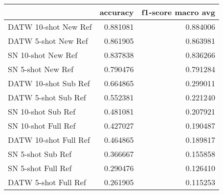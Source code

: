 \begin{tabular}{lrr}
\toprule
 & accuracy & f1-score macro avg \\
\midrule
DATW 10-shot New Ref & {\cellcolor[HTML]{08306B}} \color[HTML]{F1F1F1} 0.881081 & {\cellcolor[HTML]{08306B}} \color[HTML]{F1F1F1} 0.884006 \\
DATW 5-shot New Ref & {\cellcolor[HTML]{083776}} \color[HTML]{F1F1F1} 0.861905 & {\cellcolor[HTML]{083674}} \color[HTML]{F1F1F1} 0.863981 \\
SN 10-shot New Ref & {\cellcolor[HTML]{084285}} \color[HTML]{F1F1F1} 0.837838 & {\cellcolor[HTML]{084082}} \color[HTML]{F1F1F1} 0.836266 \\
SN 5-shot New Ref & {\cellcolor[HTML]{0C56A0}} \color[HTML]{F1F1F1} 0.790476 & {\cellcolor[HTML]{084F99}} \color[HTML]{F1F1F1} 0.791284 \\
DATW 10-shot Sub Ref & {\cellcolor[HTML]{3B8BC2}} \color[HTML]{F1F1F1} 0.664865 & {\cellcolor[HTML]{C8DCF0}} \color[HTML]{000000} 0.299011 \\
DATW 5-shot Sub Ref & {\cellcolor[HTML]{77B5D9}} \color[HTML]{000000} 0.552381 & {\cellcolor[HTML]{DCE9F6}} \color[HTML]{000000} 0.221240 \\
SN 10-shot Sub Ref & {\cellcolor[HTML]{A5CDE3}} \color[HTML]{000000} 0.481081 & {\cellcolor[HTML]{DFECF7}} \color[HTML]{000000} 0.207921 \\
SN 10-shot Full Ref & {\cellcolor[HTML]{C1D9ED}} \color[HTML]{000000} 0.427027 & {\cellcolor[HTML]{E3EEF9}} \color[HTML]{000000} 0.190487 \\
DATW 10-shot Full Ref & {\cellcolor[HTML]{AED1E7}} \color[HTML]{000000} 0.464865 & {\cellcolor[HTML]{E4EFF9}} \color[HTML]{000000} 0.189817 \\
SN 5-shot Sub Ref & {\cellcolor[HTML]{D6E5F4}} \color[HTML]{000000} 0.366667 & {\cellcolor[HTML]{EDF4FC}} \color[HTML]{000000} 0.155858 \\
SN 5-shot Full Ref & {\cellcolor[HTML]{EEF5FC}} \color[HTML]{000000} 0.290476 & {\cellcolor[HTML]{F5F9FE}} \color[HTML]{000000} 0.126410 \\
DATW 5-shot Full Ref & {\cellcolor[HTML]{F7FBFF}} \color[HTML]{000000} 0.261905 & {\cellcolor[HTML]{F7FBFF}} \color[HTML]{000000} 0.115253 \\
\bottomrule
\end{tabular}
